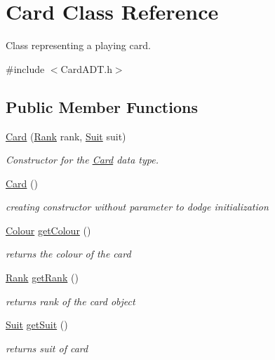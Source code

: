 \hypertarget{class_card}{}\section{Card Class Reference}
\label{class_card}


Class representing a playing card.  




{\ttfamily \#include $<$Card\+A\+D\+T.\+h$>$}

\subsection*{Public Member Functions}
\begin{DoxyCompactItemize}
\item 
\hyperlink{class_card_a1916ee0cda56d35edb572029ada2232c}{Card} (\hyperlink{_card_a_d_t_8h_adf74d53cd68bbef55ba510b266ecbbed}{Rank} rank, \hyperlink{_card_a_d_t_8h_af78e1c8ea5e6837b6ab9452a1e435e4e}{Suit} suit)
\begin{DoxyCompactList}\small\item\em Constructor for the \hyperlink{class_card}{Card} data type. \end{DoxyCompactList}\item 
\hyperlink{class_card_a783f5854cbe8c183ee3d4414c01472c0}{Card} ()\hypertarget{class_card_a783f5854cbe8c183ee3d4414c01472c0}{}\label{class_card_a783f5854cbe8c183ee3d4414c01472c0}

\begin{DoxyCompactList}\small\item\em creating constructor without parameter to dodge initialization \end{DoxyCompactList}\item 
\hyperlink{_card_a_d_t_8h_a7dae1270b9f323383fd77c3160a9927d}{Colour} \hyperlink{class_card_aaeb194c82f27e4256ae77deb5d89e335}{get\+Colour} ()
\begin{DoxyCompactList}\small\item\em returns the colour of the card \end{DoxyCompactList}\item 
\hyperlink{_card_a_d_t_8h_adf74d53cd68bbef55ba510b266ecbbed}{Rank} \hyperlink{class_card_aa517965f79ea53240c9208bbe4ec86be}{get\+Rank} ()
\begin{DoxyCompactList}\small\item\em returns rank of the card object \end{DoxyCompactList}\item 
\hyperlink{_card_a_d_t_8h_af78e1c8ea5e6837b6ab9452a1e435e4e}{Suit} \hyperlink{class_card_a3b1a0b15ea942b878d6344a1287c5351}{get\+Suit} ()
\begin{DoxyCompactList}\small\item\em returns suit of card \end{DoxyCompactList}\end{DoxyCompactItemize}


